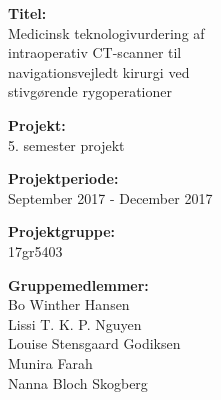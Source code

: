 \begin{minipage}[t]{0.48\textwidth}
\textbf{Titel:} %
\\\hspace*{2ex} 
Medicinsk teknologivurdering af \\\hspace*{2ex} 
intraoperativ CT-scanner til  \\\hspace*{2ex} 
navigationsvejledt kirurgi ved \\\hspace*{2ex} 
stivgørende rygoperationer \\\hspace*{2ex} 

\textbf{Projekt:} %
\\\hspace*{2ex}
5. semester projekt \\\hspace*{2ex}

\textbf{Projektperiode:} %
\\\hspace*{2ex}
September 2017 - December 2017 \\\hspace*{2ex}

\textbf{Projektgruppe:} %
\\\hspace*{2ex}
17gr5403\\\hspace*{2ex}

\textbf{Gruppemedlemmer:} %
\\\hspace*{2ex}
Bo Winther Hansen\\\hspace*{2ex}
Lissi T. K. P. Nguyen\\\hspace*{2ex}
Louise Stensgaard Godiksen\\\hspace*{2ex}
Munira Farah\\\hspace*{2ex}
Nanna Bloch Skogberg\\ \bigskip\hspace{2ex}



\end{minipage}
